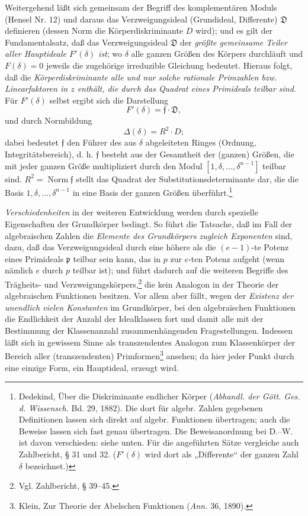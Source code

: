 \documentclass[11pt]{article}
\providecommand{\frp}{\mathfrak p}
\providecommand{\frf}{\mathfrak f}
\providecommand{\frD}{\mathfrak D}
\begin{document}
Weitergehend läßt sich gemeinsam der Begriff des komplementären Moduls (Hensel Nr. 12) und daraus das Verzweigungsideal (Grundideal, Differente) \(\frD\) definieren (dessen Norm die Körperdiskriminante \(D\) wird); und es gilt der Fundamentalsatz, daß das Verzweigungsideal \(\frD\) der \emph{größte gemeinsame Teiler aller Hauptideale \(F'(\delta)\) ist}; wo \(\delta\) alle ganzen Größen des Körpers durchläuft und \(F(\delta)=0\) jeweils die zugehörige irreduzible Gleichung bedeutet. Hieraus folgt, daß die \emph{Körperdiskriminante alle und nur solche rationale Primzahlen bzw. Linearfaktoren in \(z\) enthält, die durch das Quadrat eines Primideals teilbar sind}. Für \(F'(\delta)\) selbst ergibt sich die Darstellung
\[
F'(\delta)=\frf\cdot\frD,
\]
und durch Normbildung
\[
\Delta(\delta)=R^2\cdot D;
\]
dabei bedeutet \(\frf\) den Führer des aus \(\delta\) abgeleiteten Ringes (Ordnung, Integritätsbereich), d. h. \(\frf\) besteht aus der Gesamtheit der (ganzen) Größen, die mit jeder ganzen Größe multipliziert durch den Modul \([1,\delta,\ldots,\delta^{n-1}]\) teilbar sind. \(R^2=\operatorname{Norm}\frf\) stellt das Quadrat der Substitutionsdeterminante dar, die die Basis \(1,\delta,\ldots,\delta^{n-1}\) in eine Basis der ganzen Größen überführt.\footnote{Dedekind, Über die Diskriminante endlicher Körper (\emph{Abhandl. der Gött. Ges. d. Wissensch.} Bd. 29, 1882). Die dort für algebr. Zahlen gegebenen Definitionen lassen sich direkt auf algebr. Funktionen übertragen; auch die Beweise lassen sich fast genau übertragen. Die Beweisanordnung bei D.--W. ist davon verschieden: siehe unten. Für die angeführten Sätze vergleiche auch Zahlbericht, § 31 und 32. (\(F'(\delta)\) wird dort als „Differente“ der ganzen Zahl \(\delta\) bezeichnet.)}

\emph{Verschiedenheiten} in der weiteren Entwicklung werden durch spezielle Eigenschaften der Grundkörper bedingt. So führt die Tatsache, daß im Fall der algebraischen Zahlen die \emph{Elemente des Grundkörpers zugleich Exponenten} sind, dazu, daß das Verzweigungsideal durch eine höhere als die \((e-1)\)-te Potenz eines Primideals \(\frp\) teilbar sein kann, das in \(p\) zur \(e\)-ten Potenz aufgeht (wenn nämlich \(e\) durch \(p\) teilbar ist); und führt dadurch auf die weiteren Begriffe des Trägheits- und Verzweigungskörpers,\footnote{Vgl. Zahlbericht, § 39--45.} die kein Analogon in der Theorie der algebraischen Funktionen besitzen. Vor allem aber fällt, wegen der \emph{Existenz der unendlich vielen Konstanten} im Grundkörper, bei den algebraischen Funktionen die Endlichkeit der Anzahl der Idealklassen fort und damit alle mit der Bestimmung der Klassenanzahl zusammenhängenden Fragestellungen. Indessen läßt sich in gewissem Sinne als transzendentes Analogon zum Klassenkörper der Bereich aller (transzendenten) Primformen\footnote{Klein, Zur Theorie der Abelschen Funktionen (\emph{Ann.} 36, 1890).} ansehen; da hier jeder Punkt durch eine einzige Form, ein Hauptideal, erzeugt wird.
\end{document}
